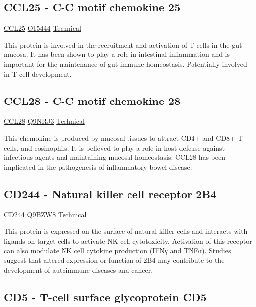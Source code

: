\subsection{CCL25 - C-C motif chemokine 25}

\href{https://en.wikipedia.org/wiki/CCL25}{CCL25}
\href{http://www.uniprot.org/uniprot/O15444}{O15444}
\href{https://olink.com/products-services/target/protein/?assayID=5121}{Technical}

This protein is involved in the recruitment and activation of T cells in the gut mucosa. It has been shown to play a role in intestinal inflammation and is important for the maintenance of gut immune homeostasis. Potentially involved in T-cell development.

\subsection{CCL28 - C-C motif chemokine 28}

\href{https://en.wikipedia.org/wiki/CCL28}{CCL28}
\href{http://www.uniprot.org/uniprot/Q9NRJ3}{Q9NRJ3}
\href{https://olink.com/products-services/target/protein/?assayID=5089}{Technical}

This chemokine is produced by mucosal tissues to attract CD4+ and CD8+ T-cells, and eosinophils. It is believed to play a role in host defense against infectious agents and maintaining mucosal homeostasis. CCL28 has been implicated in the pathogenesis of inflammatory bowel disease.

\subsection{CD244 - Natural killer cell receptor 2B4}

\href{https://en.wikipedia.org/wiki/CD244}{CD244}
\href{http://www.uniprot.org/uniprot/Q9BZW8}{Q9BZW8}
\href{https://olink.com/products-services/target/protein/?assayID=5068}{Technical}

This protein is expressed on the surface of natural killer cells and interacts with ligands on target cells to activate NK cell cytotoxicity. Activation of this receptor can also modulate NK cell cytokine production (IFNγ and TNFα). Studies suggest that altered expression or function of 2B4 may contribute to the development of autoimmune diseases and cancer.

\subsection{CD5 - T-cell surface glycoprotein CD5}

